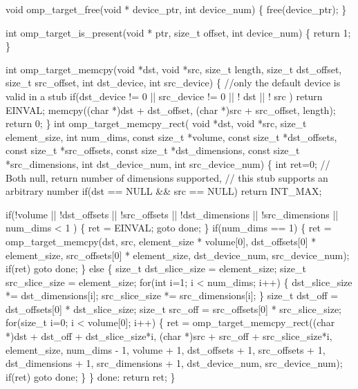 {\begin{codepar}
void omp\_target\_free(void * device\_ptr, int device\_num)
\{
    free(device\_ptr);
\}

int omp\_target\_is\_present(void * ptr, size\_t offset,
                             int device\_num)
\{
    return 1;
\}

int omp\_target\_memcpy(void *dst, void *src, size\_t length,
                      size\_t dst\_offset, size\_t src\_offset,
                      int dst\_device, int src\_device)
\{
    //only the default device is valid in a stub
    if(dst\_device != 0 || src\_device != 0
            || ! dst || ! src )
        return EINVAL;
    memcpy((char *)dst + dst\_offset,
           (char *)src + src\_offset,
           length);
    return 0;
\}
int omp\_target\_memcpy\_rect(
    void *dst, void *src,
    size\_t element\_size,
    int num\_dims,
    const size\_t *volume,
    const size\_t *dst\_offsets,
    const size\_t *src\_offsets,
    const size\_t *dst\_dimensions,
    const size\_t *src\_dimensions,
    int dst\_device\_num, int src\_device\_num)
\{
    int ret=0;
    // Both null, return number of dimensions supported,
    // this stub supports an arbitrary number
    if(dst == NULL && src == NULL) return INT\_MAX;

    if(!volume || !dst\_offsets || !src\_offsets
            || !dst\_dimensions || !src\_dimensions
            || num\_dims < 1 ) \{
        ret = EINVAL;
        goto done;
    \}
    if(num\_dims == 1) \{
        ret = omp\_target\_memcpy(dst, src,
                                element\_size * volume[0],
                                dst\_offsets[0] * element\_size,
                                src\_offsets[0] * element\_size,
                                dst\_device\_num, src\_device\_num);
        if(ret) goto done;
    \} else \{
        size\_t dst\_slice\_size = element\_size;
        size\_t src\_slice\_size = element\_size;
        for(int i=1; i < num\_dims; i++) \{
            dst\_slice\_size *= dst\_dimensions[i];
            src\_slice\_size *= src\_dimensions[i];
        \}
        size\_t dst\_off = dst\_offsets[0] * dst\_slice\_size;
        size\_t src\_off = src\_offsets[0] * src\_slice\_size;
        for(size\_t i=0; i < volume[0]; i++) \{
            ret = omp\_target\_memcpy\_rect((char *)dst + dst\_off + dst\_slice\_size*i,
                                         (char *)src + src\_off + src\_slice\_size*i,
                                         element\_size,
                                         num\_dims - 1,
                                         volume + 1,
                                         dst\_offsets + 1,
                                         src\_offsets + 1,
                                         dst\_dimensions + 1,
                                         src\_dimensions + 1,
                                         dst\_device\_num,
                                         src\_device\_num);
            if(ret) goto done;
        \}
    \}
done:
    return ret;
\}


\end{codepar}}
